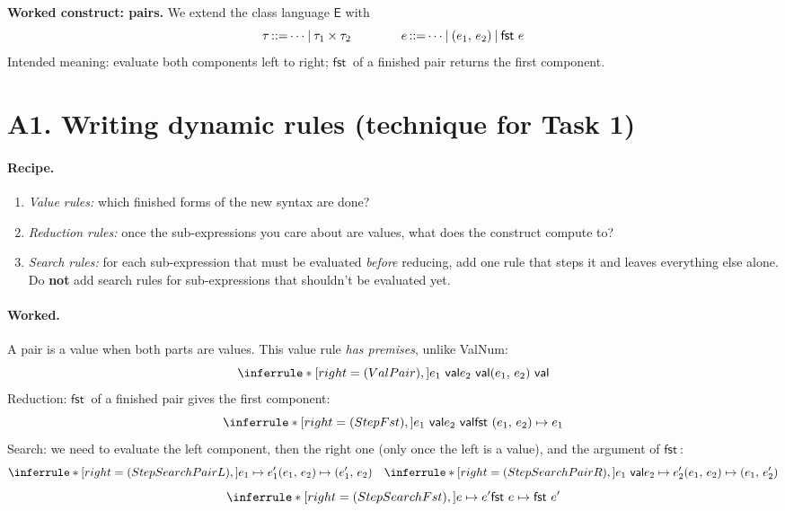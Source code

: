 \documentclass[11pt]{article}
\newcommand{\val}[1]{#1\ \mathsf{val}}
\newcommand{\stepto}[2]{#1 \mapsto #2}
\newcommand{\PAIR}[2]{(#1,\, #2)}
\newcommand{\FST}[1]{\mathsf{fst}\ #1}
\begin{document}
\textbf{Worked construct: pairs.} We extend the class language $\mathsf{E}$ with
\[
  \tau \bnfdef \cdots \bnfalt \tau_1\times\tau_2
  \qquad\qquad
  e \bnfdef \cdots \bnfalt \PAIR{e_1}{e_2} \bnfalt \FST{e}
\]
Intended meaning: evaluate both components left to right; $\FST{}$ of a
finished pair returns the first component.

\section*{A1. Writing dynamic rules \hfill (technique for Task 1)}

\paragraph{Recipe.}
\begin{enumerate}
  \item \emph{Value rules:} which finished forms of the new syntax are done?
  \item \emph{Reduction rules:} once the sub-expressions you care about are
        values, what does the construct compute to?
  \item \emph{Search rules:} for each sub-expression that must be evaluated
        \emph{before} reducing, add one rule that steps it and leaves
        everything else alone. Do \textbf{not} add search rules for
        sub-expressions that shouldn't be evaluated yet.
\end{enumerate}

\paragraph{Worked.} A pair is a value when both parts are values. This value
rule \emph{has premises}, unlike ValNum:
\[
  \Rule{ValPair}{\val{e_1} \\ \val{e_2}}{\val{\PAIR{e_1}{e_2}}}
\]
Reduction: $\FST{}$ of a finished pair gives the first component:
\[
  \Rule{StepFst}{\val{e_1} \\ \val{e_2}}{\stepto{\FST{\PAIR{e_1}{e_2}}}{e_1}}
\]
Search: we need to evaluate the left component, then the right one (only
once the left is a value), and the argument of $\FST{}$:
\[
  \Rule{StepSearchPairL}{\stepto{e_1}{e_1'}}
       {\stepto{\PAIR{e_1}{e_2}}{\PAIR{e_1'}{e_2}}}
  \quad
  \Rule{StepSearchPairR}{\val{e_1} \\ \stepto{e_2}{e_2'}}
       {\stepto{\PAIR{e_1}{e_2}}{\PAIR{e_1}{e_2'}}}
\]
\[
  \Rule{StepSearchFst}{\stepto{e}{e'}}{\stepto{\FST{e}}{\FST{e'}}}
\]
\end{document}
